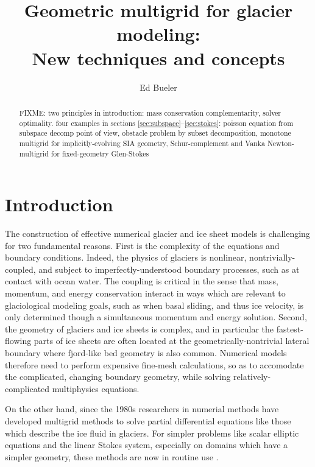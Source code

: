 \documentclass[letterpaper,final,12pt,reqno]{amsart}
\theoremstyle{claim}
\numberwithin{equation}{section}
\numberwithin{figure}{section}
\numberwithin{table}{section}
\numberwithin{theorem}{section}
\begin{document}
\title[Geometric multigrid for glacier modeling]{Geometric multigrid for glacier modeling: \\ New techniques and concepts}

\author{Ed Bueler}

\begin{abstract} FIXME: two principles in introduction: mass conservation complementarity, solver optimality.  four examples in sections \ref{sec:subspace}--\ref{sec:stokes}: poisson equation from subspace decomp point of view, obstacle problem by subset decomposition, monotone multigrid for implicitly-evolving SIA geometry, Schur-complement and Vanka Newton-multigrid for fixed-geometry Glen-Stokes
\end{abstract}

\maketitle

\tableofcontents

\thispagestyle{empty}
\bigskip

\section{Introduction} \label{sec:intro}

The construction of effective numerical glacier and ice sheet models is challenging for two fundamental reasons.  First is the complexity of the equations and boundary conditions.  Indeed, the physics of glaciers is nonlinear, nontrivially-coupled, and subject to imperfectly-understood boundary processes, such as at contact with ocean water.  The coupling is critical in the sense that mass, momentum, and energy conservation interact in ways which are relevant to glaciological modeling goals, such as when basal sliding, and thus ice velocity, is only determined though a simultaneous momentum and energy solution.  Second, the geometry of glaciers and ice sheets is complex, and in particular the fastest-flowing parts of ice sheets are often located at the geometrically-nontrivial lateral boundary where fjord-like bed geometry is also common.  Numerical models therefore need to perform expensive fine-mesh calculations, so as to accomodate the complicated, changing boundary geometry, while solving relatively-complicated multiphysics equations.

On the other hand, since the 1980s researchers in numerial methods have developed multigrid methods to solve partial differential equations like those which describe the ice fluid in glaciers.   For simpler problems like scalar elliptic equations and the linear Stokes system, especially on domains which have a simpler geometry, these methods are now in routine use \cite{Briggsetal2000,Bueler2021,Trottenbergetal2001}.
\end{document}
